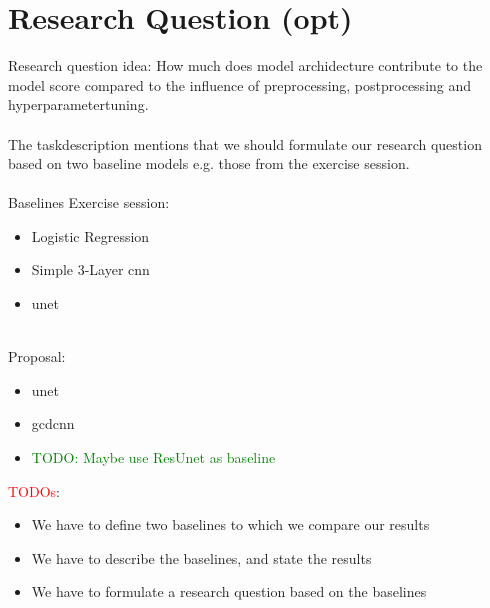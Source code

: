 \section{Research Question (opt)}

Research question idea: How much does model archidecture contribute to the model score compared to the influence of preprocessing, postprocessing and hyperparametertuning.\\ \\




The taskdescription mentions that we should formulate our research question based on two baseline models e.g. those from the exercise session.\\\\
Baselines Exercise session:
\begin{itemize}
    \item Logistic Regression
    \item Simple 3-Layer \acrshort{cnn}
    \item \acrshort{unet}\\\\
\end{itemize}

Proposal:
\begin{itemize}
    \item \acrshort{unet}
    \item \acrshort{gcdcnn}
    \item \textcolor{green}{TODO: Maybe use ResUnet as baseline}
\end{itemize}

\textcolor{red}{TODOs}:
\begin{itemize}
    \item We have to define two baselines to which we compare our results
    \item We have to describe the baselines, and state the results 
    \item We have to formulate a research question based on the baselines
\end{itemize}